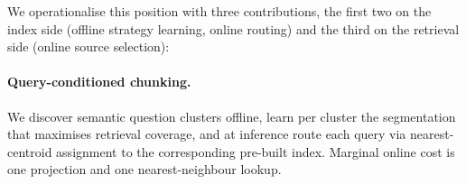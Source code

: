 

 



We operationalise this position with three contributions, the first
two on the index side (offline strategy learning, online routing) and
the third on the retrieval side (online source selection):

\paragraph{Query-conditioned chunking.} We discover semantic
question clusters offline, learn per cluster the segmentation
that maximises retrieval coverage, and at inference route each
query via nearest-centroid assignment to the corresponding
pre-built index. Marginal online cost is
one projection and one nearest-neighbour lookup.

